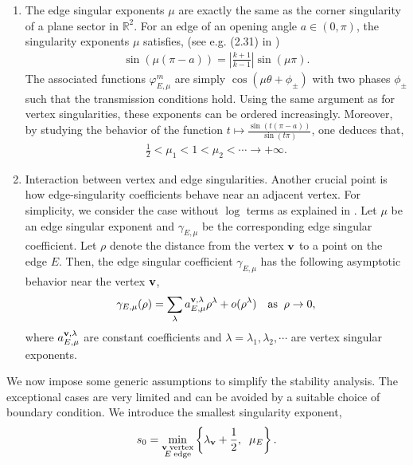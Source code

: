 ﻿\documentclass[11pt,reqno,oneside]{amsart}
\theoremstyle{definition}
\theoremstyle{remark}
\newcommand{\R}{\mathbb{R}}
\newcommand{\g}{\gamma}
\newcommand{\vf}{\varphi}
\newcommand{\lm}{\lambda}
\renewcommand{\t}{\theta}
\begin{document}
\begin{enumerate}
        \item The edge singular exponents $\mu$ are exactly the same as the corner singularity of a plane sector in $\R^2$. For an edge of an opening angle $a\in (0,\pi)$, the singularity exponents $\mu$ satisfies, (see e.g. (2.31) in \cite{Bellout1992}) 
        \begin{align}\label{eq:edge-expo}
            \sin(\mu(\pi-a))=\left|\frac{k+1}{k-1}\right|\sin(\mu \pi).
        \end{align}
        The associated functions $\vf_{E,\mu}^m$ are simply $\cos(\mu\t+\phi_\pm)$ with two phases $\phi_\pm$ such that the transmission conditions hold. Using the same argument as for vertex singularities, these exponents can be ordered increasingly. Moreover, by studying the behavior of the function $t\mapsto \frac{\sin(t(\pi-a))}{\sin(t\pi)}$, one deduces that,
        \begin{align}\label{eq:les-mu}
            \frac{1}{2}<\mu_1<1<\mu_2<\cdots \rightarrow +\infty.
        \end{align}
        \item Interaction between vertex and edge singularities. Another crucial point is how edge-singularity coefficients behave near an adjacent vertex. For simplicity, we consider the case without $\log$ terms as explained in . Let $\mu$ be an edge singular exponent and $\g_{E,\mu}$ be the corresponding edge singular coefficient. Let $\rho$ denote the distance from the vertex $\bf v$ to a point on the edge $E$. Then, the edge singular coefficient $\g_{E,\mu}$ has the following asymptotic behavior \cite{Dauge1999} near the vertex $\bf v$,
        \begin{align}\label{eq:asym-coef}
            \g_{E,\mu}(\rho)= \sum_{\lm } a_{E,\mu}^{{\bf v},\lm}\rho^{\lm}+o (\rho^{\lm}) \quad {\rm as}\;\; \rho\rightarrow 0,
        \end{align}
        where $a_{E,\mu}^{{\bf v},\lm}$ are constant coefficients and $\lm=\lm_1,\lm_2,\cdots$ are vertex singular exponents.
    \end{enumerate}

    \medskip

    We now impose some generic assumptions to simplify the stability analysis. The exceptional cases are very limited and can be avoided by a suitable choice of boundary condition. We introduce the smallest singularity exponent,
        \begin{align}\label{eq:def-s0}
            s_0=\min_{\begin{subarray}{c} {\bf v}\; {\rm vertex} \\ E\; {\rm edge} \end{subarray}} \left\lbrace\lm_{{\bf v}}+\frac{1}{2},\;\;\mu_{E} \right\rbrace.
        \end{align}
\end{document}
